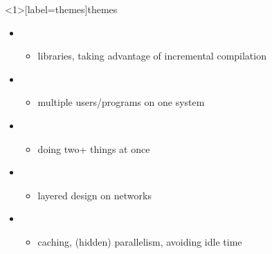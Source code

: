 \begin{frame}<1>[label=themes]{themes}
\begin{itemize}
    \item {}
        \begin{itemize}
        \item libraries, taking advantage of incremental compilation
        \end{itemize}
    \item {}
        \begin{itemize}
        \item multiple users/programs on one system
        \end{itemize}
    \item {}
        \begin{itemize}
        \item doing two+ things at once
        \end{itemize}
    \item {}
        \begin{itemize}
        \item layered design on networks
        \end{itemize}
    \item {}
        \begin{itemize}
        \item caching, (hidden) parallelism, avoiding idle time
        \end{itemize}
    \end{itemize}
\end{frame}
